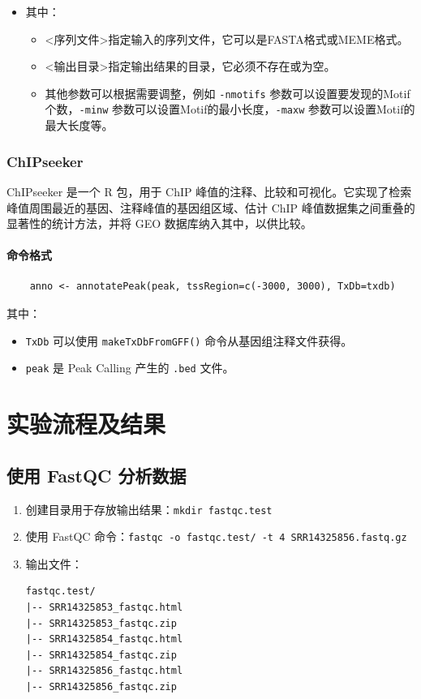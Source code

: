 \documentclass[UTF8]{ctexart}
\begin{document}
\begin{itemize}
	\item 其中：
	\begin{itemize}
		\item <序列文件>指定输入的序列文件，它可以是FASTA格式或MEME格式。
		\item <输出目录>指定输出结果的目录，它必须不存在或为空。
		\item 其他参数可以根据需要调整，例如 \verb|-nmotifs| 参数可以设置要发现的Motif个数，\verb|-minw| 参数可以设置Motif的最小长度，\verb|-maxw| 参数可以设置Motif的最大长度等。
	\end{itemize}
\end{itemize}

\subsubsection{ChIPseeker}

ChIPseeker 是一个 R 包，用于 ChIP 峰值的注释、比较和可视化。它实现了检索峰值周围最近的基因、注释峰值的基因组区域、估计 ChIP 峰值数据集之间重叠的显著性的统计方法，并将 GEO 数据库纳入其中，以供比较。

\paragraph*{命令格式}
\begin{lstlisting}
	anno <- annotatePeak(peak, tssRegion=c(-3000, 3000), TxDb=txdb)
\end{lstlisting}

其中：

\begin{itemize}
	\item \verb|TxDb| 可以使用 \verb|makeTxDbFromGFF()| 命令从基因组注释文件获得。
	\item \verb|peak| 是 Peak Calling 产生的 \verb|.bed| 文件。 
\end{itemize}

\section{实验流程及结果}

\subsection{使用 FastQC 分析数据}

\begin{enumerate}
	\item 创建目录用于存放输出结果：\verb|mkdir fastqc.test|
	\item 使用 FastQC 命令：\verb|fastqc -o fastqc.test/ -t 4 SRR14325856.fastq.gz |
	\item 输出文件：
	\begin{lstlisting}
fastqc.test/
|-- SRR14325853_fastqc.html
|-- SRR14325853_fastqc.zip
|-- SRR14325854_fastqc.html
|-- SRR14325854_fastqc.zip
|-- SRR14325856_fastqc.html
|-- SRR14325856_fastqc.zip
	\end{lstlisting}
\end{enumerate}
\end{document}
